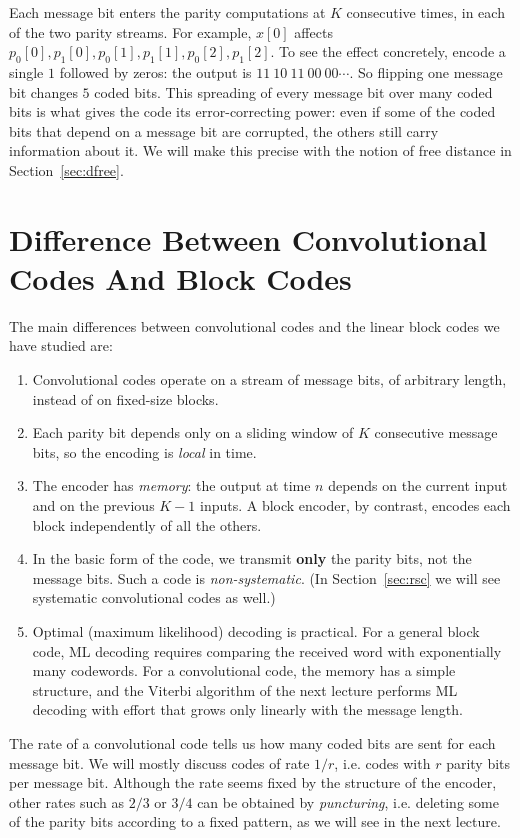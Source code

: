 Each message bit enters the parity computations at \(K\) consecutive times, in each of the two parity streams. For example, \(x[0]\) affects \(p_0[0], p_1[0], p_0[1], p_1[1], p_0[2], p_1[2]\). To see the effect concretely, encode a single \(1\) followed by zeros: the output is \(11\ 10\ 11\ 00\ 00 \cdots\). So flipping one message bit changes \(5\) coded bits. This spreading of every message bit over many coded bits is what gives the code its error-correcting power: even if some of the coded bits that depend on a message bit are corrupted, the others still carry information about it. We will make this precise with the notion of free distance in Section~\ref{sec:dfree}.

\section{Difference Between Convolutional Codes And Block Codes}
The main differences between convolutional codes and the linear block codes we have studied are:
\begin{enumerate}
    \item Convolutional codes operate on a stream of message bits, of arbitrary length, instead of on fixed-size blocks.
    \item Each parity bit depends only on a sliding window of \(K\) consecutive message bits, so the encoding is \emph{local} in time.
    \item The encoder has \emph{memory}: the output at time \(n\) depends on the current input and on the previous \(K-1\) inputs. A block encoder, by contrast, encodes each block independently of all the others.
    \item In the basic form of the code, we transmit \textbf{only} the parity bits, not the message bits. Such a code is \emph{non-systematic}. (In Section~\ref{sec:rsc} we will see systematic convolutional codes as well.)
    \item Optimal (maximum likelihood) decoding is practical. For a general block code, ML decoding requires comparing the received word with exponentially many codewords. For a convolutional code, the memory has a simple structure, and the Viterbi algorithm of the next lecture performs ML decoding with effort that grows only linearly with the message length.
\end{enumerate}

The rate of a convolutional code tells us how many coded bits are sent for each message bit. We will mostly discuss codes of rate \(1/r\), i.e. codes with \(r\) parity bits per message bit. Although the rate seems fixed by the structure of the encoder, other rates such as \(2/3\) or \(3/4\) can be obtained by \emph{puncturing}, i.e. deleting some of the parity bits according to a fixed pattern, as we will see in the next lecture.

